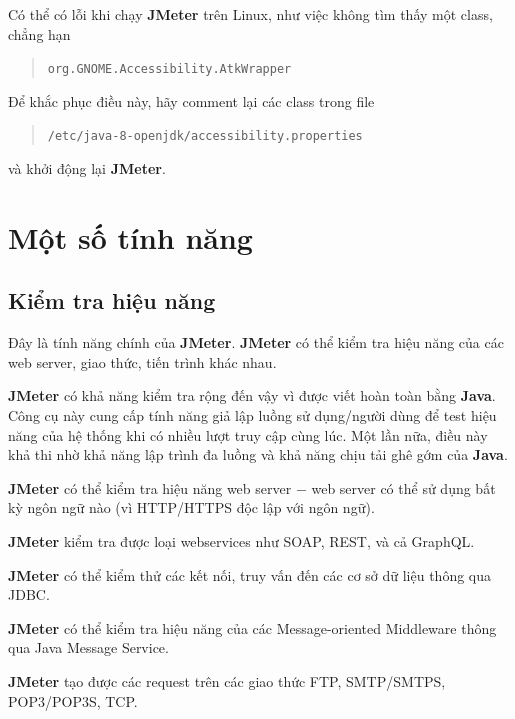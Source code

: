 \documentclass[12pt]{report}
\newcommand{\jmeter}{\textbf{JMeter}}
\begin{document}
\par Có thể có lỗi khi chạy \jmeter{} trên Linux, như việc không tìm thấy một class, chẳng hạn
\begin{quotation}
    \texttt{org.GNOME.Accessibility.AtkWrapper}
\end{quotation}

\par Để khắc phục điều này, hãy comment lại các class trong file
\begin{quotation}
    \texttt{/etc/java-8-openjdk/accessibility.properties}
\end{quotation}
\par và khởi động lại \jmeter{}.


\chapter{Một số tính năng}

\section{Kiểm tra hiệu năng}

\par Đây là tính năng chính của \jmeter{}. \jmeter{} có thể kiểm tra hiệu năng của các web server, giao thức, tiến trình khác nhau.

\par \jmeter{} có khả năng kiểm tra rộng đến vậy vì được viết hoàn toàn bằng \textbf{Java}. Công cụ này cung cấp tính năng giả lập luồng sử dụng/người dùng để test hiệu năng của hệ thống khi có nhiều lượt truy cập cùng lúc. Một lần nữa, điều này khả thi nhờ khả năng lập trình đa luồng và khả năng chịu tải ghê gớm của \textbf{Java}.

\bigskip

\par \jmeter{} có thể kiểm tra hiệu năng web server $-$ web server có thể sử dụng bất kỳ ngôn ngữ nào (vì HTTP/HTTPS độc lập với ngôn ngữ).
\par \jmeter{} kiểm tra được loại webservices như SOAP, REST, và cả GraphQL.\@
\par \jmeter{} có thể kiểm thử các kết nối, truy vấn đến các cơ sở dữ liệu thông qua JDBC.\@
\par \jmeter{} có thể kiểm tra hiệu năng của các Message-oriented Middleware thông qua Java Message Service.
\par \jmeter{} tạo được các request trên các giao thức FTP, SMTP/SMTPS, POP3/POP3S, TCP.\@
\end{document}
